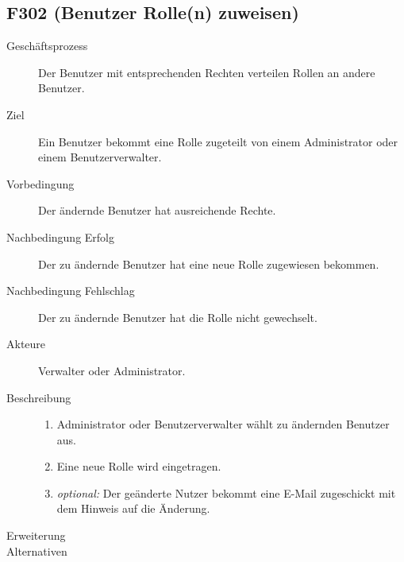 \subsection{F302 (Benutzer Rolle(n) zuweisen)}
\label{F:rollen}
\begin{description}
  \item[Geschäftsprozess]Der Benutzer mit entsprechenden Rechten verteilen Rollen an andere Benutzer.
  \item[Ziel]Ein Benutzer bekommt eine Rolle zugeteilt von einem Administrator oder einem Benutzerverwalter.
  \item[Vorbedingung]Der ändernde Benutzer hat ausreichende Rechte.
  \item[Nachbedingung Erfolg]Der zu ändernde Benutzer hat eine neue Rolle zugewiesen bekommen.
  \item[Nachbedingung Fehlschlag]Der zu ändernde Benutzer hat die Rolle nicht gewechselt.
  \item[Akteure]Verwalter oder Administrator.
  \item[Beschreibung]\hfill
  \begin{enumerate}
  \item Administrator oder Benutzerverwalter wählt zu ändernden Benutzer aus.
  \item Eine neue Rolle wird eingetragen.
  \item \emph{optional:} Der geänderte Nutzer bekommt eine E-Mail zugeschickt mit dem Hinweis auf die Änderung.
  \end{enumerate}
  \item[Erweiterung]
  \item[Alternativen]
\end{description}
